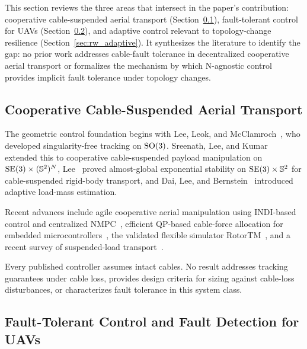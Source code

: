 This section reviews the three areas that intersect in the paper's contribution: cooperative cable-suspended aerial transport (Section~\ref{sec:rw_transport}), fault-tolerant control for UAVs (Section~\ref{sec:rw_ftc}), and adaptive control relevant to topology-change resilience (Section~\ref{sec:rw_adaptive}). It synthesizes the literature to identify the gap: no prior work addresses cable-fault tolerance in decentralized cooperative aerial transport or formalizes the mechanism by which N-agnostic control provides implicit fault tolerance under topology changes.
\subsection{Cooperative Cable-Suspended Aerial Transport}
\label{sec:rw_transport}

The geometric control foundation begins with Lee, Leok, and McClamroch~\cite{lee2010geometric}, who developed singularity-free tracking on $\mathrm{SO}(3)$. Sreenath, Lee, and Kumar~\cite{sreenath2013geometric} extended this to cooperative cable-suspended payload manipulation on $\mathrm{SE}(3) \times (\mathbb{S}^2)^N$, Lee~\cite{lee2018geometric} proved almost-global exponential stability on $\mathrm{SE}(3) \times \mathbb{S}^2$ for cable-suspended rigid-body transport, and Dai, Lee, and Bernstein~\cite{wu2014geometric} introduced adaptive load-mass estimation.

Recent advances include agile cooperative aerial manipulation using INDI-based control and centralized NMPC~\cite{sun2025agile}, efficient QP-based cable-force allocation for embedded microcontrollers~\cite{wahba2024efficient}, the validated flexible simulator RotorTM~\cite{li2024rotortm}, and a recent survey of suspended-load transport~\cite{estevez2024review}.

Every published controller assumes intact cables. No result addresses tracking guarantees under cable loss, provides design criteria for sizing against cable-loss disturbances, or characterizes fault tolerance in this system class.

\subsection{Fault-Tolerant Control and Fault Detection for UAVs}
\label{sec:rw_ftc}


